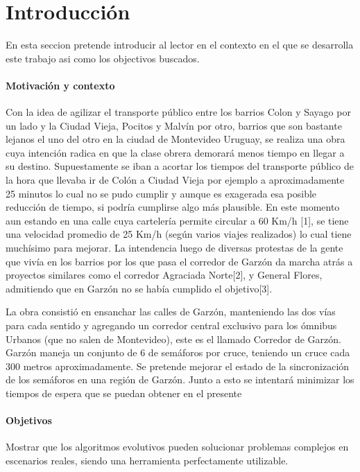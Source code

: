 \chapter{Introducción}
En esta seccion pretende introducir al lector en el contexto en el que se desarrolla este trabajo asi como los objectivos buscados.

\subsubsection{Motivación y contexto}
Con  la  idea  de  agilizar  el  transporte  público  entre  los
barrios Colon y Sayago por un lado y la Ciudad Vieja, Pocitos
y Malvín por otro, barrios que son bastante lejanos el uno del
otro en la ciudad de Montevideo Uruguay, se realiza una obra
cuya  intención radica  en que la  clase obrera demorará  menos
tiempo en llegar a su destino.
Supuestamente se iban a acortar los tiempos del transporte
público de la hora que llevaba ir de Colón a Ciudad Vieja por
ejemplo  a  aproximadamente  25  minutos  lo  cual  no  se  pudo
cumplir  y  aunque  es  exagerada  esa  posible  reducción  de
tiempo,  si  podría  cumplirse  algo  más  plausible.  En  este
momento  aun  estando  en  una  calle  cuya  cartelería  permite
circular a 60 Km/h  [1], se tiene una velocidad promedio de 25
Km/h (según varios viajes realizados) lo cual tiene muchísimo
para mejorar.
La intendencia luego de diversas protestas de la gente que
vivía en los barrios por los que pasa el corredor de Garzón da
marcha atrás a proyectos similares como el corredor Agraciada
Norte[2],  y  General  Flores,  admitiendo  que  en  Garzón  no  se
había cumplido el objetivo[3].

La  obra  consistió  en  ensanchar  las  calles  de  Garzón,
manteniendo  las  dos  vías  para  cada  sentido  y  agregando  un
corredor central exclusivo para los ómnibus Urbanos (que no
salen de Montevideo), este es el llamado Corredor de Garzón.
Garzón  maneja  un  conjunto de 6 de  semáforos por  cruce,
teniendo  un  cruce  cada  300  metros  aproximadamente.  Se
pretende  mejorar  el  estado  de  la  sincronización  de  los
semáforos en  una región de Garzón. Junto a esto se intentará
minimizar los tiempos de espera que se puedan obtener en el
presente
\subsubsection{Objetivos}
Mostrar que los algoritmos evolutivos pueden solucionar problemas complejos en escenarios  reales, siendo una herramienta perfectamente utilizable.
